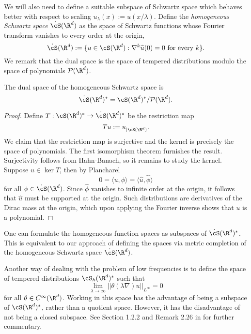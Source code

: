 We will also need to define a suitable subspace of Schwartz space which behaves better with respect to scaling $u_\lambda (x) := u(x/\lambda)$. Define the \emph{homogeneous Schwartz space} $\dot \cS (\R^d)$ as the space of Schwartz functions whose Fourier transform vanishes to every order at the origin, 
	\[\dot \cS (\R^d) := \{ u \in \cS (\R^d) : \nabla^k \widehat u (0) = 0 \text{ for every $k$} \}. \]
We remark that the dual space is the space of tempered distributions modulo the space of polynomials $\mathcal P (\R^d)$. 	
	
\begin{proposition}
	The dual space of the homogeneous Schwartz space is
		\[ \dot \cS (\R^d)^* = \cS(\R^d)^* / \mathcal P (\R^d). \]
\end{proposition}

\begin{proof}
	Define $T: \cS (\R^d)^* \to \dot \cS (\R^d)^*$ be the restriction map
		\[ T u := u_{|\dot \cS (\R^d)}.  \]
	We claim that the restriction map is surjective and the kernel is precisely the space of polynomials. The first isomorphism theorem furnishes the result. Surjectivity follows from Hahn-Banach, so it remains to study the kernel. 	Suppose $u \in \operatorname{ker} T$, then by Plancharel 
		\[ 0 = \langle u, \phi \rangle = \langle \widehat u, \widehat \phi \rangle \]
	for all $\phi \in \dot \cS (\R^d)$. Since $\widehat \phi$ vanishes to infinite order at the origin, it follows that $\widehat u$ must be supported at the origin. Such distributions are derivatives of the Dirac mass at the origin, which upon applying the Fourier inverse shows that $u$ is a polynomial. 
\end{proof}	

\begin{remark}
	One can formulate the homogeneous function spaces as subspaces of $\dot \cS (\R^d)^*$. This is equivalent to our approach of defining the spaces via metric completion of the homogeneous Schwartz space $\dot \cS (\R^d)$. 
	
	Another way of dealing with the problem of low frequencies is to define the space of tempered distributions $\cS_h (\R^d)^*$ such that 
		\[ \lim_{\lambda \to \infty} ||\theta (\lambda \nabla) u||_{L^\infty} = 0 \]
	for all $\theta \in C^\infty (\R^d)$. Working in this space has the advantage of being a subspace of $\cS(\R^d)^*$, rather than a quotient space. However, it has the disadvantage of not being a closed subspace. See Section 1.2.2 and Remark 2.26 in \cite{BahouriEtAl2011} for further commentary. 
\end{remark}